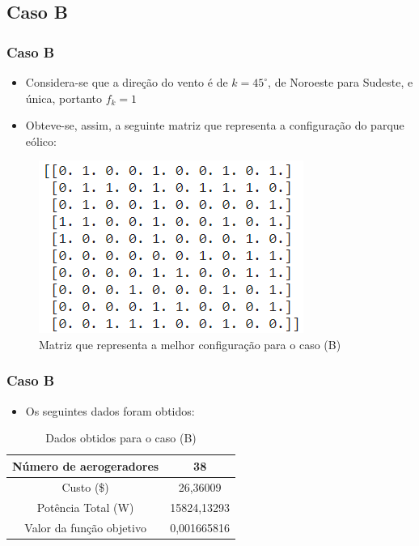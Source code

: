 \documentclass{beamer}
\begin{document}
	\subsection{Caso B}
	\begin{frame}
		\frametitle{Caso B}
		\begin{itemize}
			\item Considera-se que a direção do vento é de $ k = 45^{\circ} $, de Noroeste para Sudeste, e única, portanto $ f_k = 1 $
			\item Obteve-se, assim, a seguinte matriz que representa a configuração do parque eólico:
		\end{itemize}
		\begin{figure}[H]
			\centering
			\includegraphics[width=0.5\linewidth]{caso_b}
			\caption{Matriz que representa a melhor configuração para o caso (B)}
			\label{fig:casob}
		\end{figure}
	\end{frame}

	\begin{frame}
		\frametitle{Caso B}
		\begin{itemize}
			\item Os seguintes dados foram obtidos:
		\end{itemize}
		\begin{table}[H]
			\centering
			\begin{tabular}{|c|c|}
				\hline
				Número de aerogeradores &  38\\
				\hline
				Custo (\$) &  26,36009\\
				\hline
				Potência Total (W) &  15824,13293\\
				\hline
				Valor da função objetivo &  0,001665816\\
				\hline
			\end{tabular}
			\caption{Dados obtidos para o caso (B)}
			\label{tab:casob}
		\end{table}	
	\end{frame}
\end{document}

